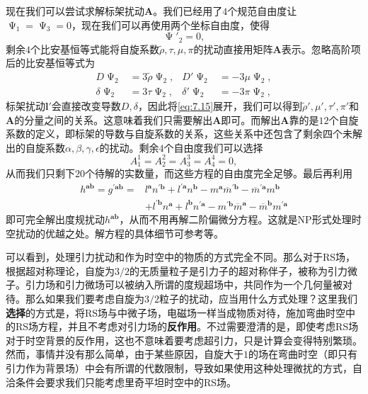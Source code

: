 现在我们可以尝试求解标架扰动$\boldsymbol{A}$。我们已经用了$4$个规范自由度让$\upPsi _{1} =\upPsi _{3} =0$，现在我们可以再使用两个坐标自由度，使得
\begin{equation*}
	\upPsi '_{2} =0,
\end{equation*}
剩余$4$个比安基恒等式能将自旋系数$\tilde{\rho } ,\tau ,\mu ,\pi $的扰动直接用矩阵$\boldsymbol{A}$表示。忽略高阶项后的比安基恒等式为
\begin{equation}
	\begin{aligned}
		D\upPsi _{2} & =3\tilde{\rho } \upPsi _{2} , & D'\upPsi _{2} & =-3\mu \upPsi _{2} ,\\
		\delta \upPsi _{2} & =3\tau \upPsi _{2} , & \delta '\upPsi _{2} & =-3\pi \upPsi _{2} ,
	\end{aligned}
	\label{eq:7.15}
\end{equation}
标架扰动$\boldsymbol{l} '$会直接改变导数$D,\delta $，因此将\ref{eq:7.15}展开，我们可以得到$\tilde{\rho } ',\mu ',\tau ',\pi '$和$\boldsymbol{A}$的分量之间的关系。这意味着我们只需要解出$\boldsymbol{A}$即可。而解出$\boldsymbol{A}$靠的是$12$个自旋系数的定义，即标架的导数与自旋系数的关系，这些关系中还包含了剩余四个未解出的自旋系数$\alpha ,\beta ,\gamma ,\epsilon $的扰动。剩余$4$个自由度我们可以选择
\begin{equation*}
	A_{1}^{1} =A_{2}^{2} =A_{3}^{3} =A_{4}^{4} =0,
\end{equation*}
从而我们只剩下$20$个待解的实数量，而这些方程的自由度完全足够。最后再利用
\begin{equation*}
	\begin{aligned}
		h^{\boldsymbol{ab}} =g^{\prime \boldsymbol{ab}} = & l^{\boldsymbol{a}} n^{\prime \boldsymbol{b}} +l^{\prime \boldsymbol{a}} n^{\boldsymbol{b}} -m^{\boldsymbol{a}}\overline{m} ^{\prime \boldsymbol{b}} -\overline{m} ^{\prime \boldsymbol{a}} m^{\boldsymbol{b}}\\
		& +l^{\prime \boldsymbol{b}} n^{\boldsymbol{a}} +l^{\boldsymbol{b}} n^{\prime \boldsymbol{a}} -m^{\prime \boldsymbol{b}}\overline{m}^{\boldsymbol{a}} -\overline{m}^{\boldsymbol{b}} m^{\prime \boldsymbol{a}}
	\end{aligned}
\end{equation*}
即可完全解出度规扰动$h^{\boldsymbol{ab}}$，从而不用再解二阶偏微分方程。这就是NP形式处理时空扰动的优越之处。解方程的具体细节可参考\parencite{chandrasekhar1998mathematical,teukolsky_perturbations_1973}等。



可以看到，处理引力扰动和作为时空中的物质的方式完全不同。那么对于RS场，根据超对称理论，自旋为$3/2$的无质量粒子是引力子的超对称伴子，被称为引力微子。引力场和引力微场可以被纳入所谓的度规超场中，共同作为一个几何量被对待\parencite{weinberg2005quantum}。那么如果我们要考虑自旋为$3/2$粒子的扰动，应当用什么方式处理？这里我们\textbf{选择}的方式是，将RS场与中微子场，电磁场一样当成物质对待，施加弯曲时空中的RS场方程，并且不考虑对引力场的\textbf{反作用}。不过需要澄清的是，即使考虑RS场对于时空背景的反作用，这也不意味着要考虑超引力，只是计算会变得特别繁琐。然而，事情并没有那么简单，由于某些原因，自旋大于$1$的场在弯曲时空（即只有引力作为背景场）中会有所谓的代数限制\parencite{buchdahl_compatibility_1958}，导致如果使用这种处理微扰的方式，自洽条件会要求我们只能考虑里奇平坦时空中的RS场。


